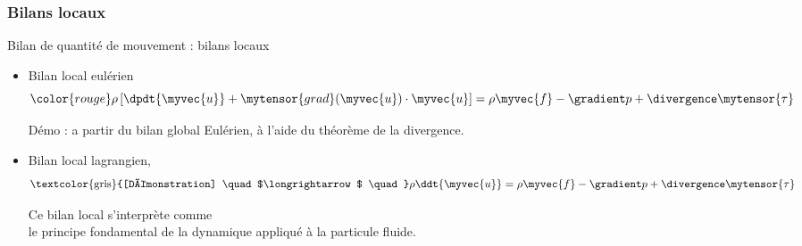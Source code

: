 \subsubsection{Bilans locaux}
\begin{frame}{Bilan de quantité de mouvement : bilans locaux}

\small


\medskip
\pause

\begin{itemize}
\item
  Bilan local eulérien 
	\begin{equation}
		\color{rouge}
		\rho \left [ \dpdt{\myvec{u}} +  \mytensor{grad}(\myvec{u}) \cdot \myvec{u} \right ]
		= \rho \myvec{f} - \gradient p + \divergence \mytensor{\tau}
		\label{eq:bilan_local_eulerien_qdm}
	\end{equation}


Démo : a partir du bilan global  Eulérien, à l'aide du théorème de la divergence.


\item
	Bilan local lagrangien, 
	\begin{equation}
		\mbox{\textcolor{gris}{[Démonstration] \quad $\longrightarrow$ \quad}}
		\rho \ddt{\myvec{u}} 
		= 
		\rho \myvec{f}  - \gradient p + \divergence \mytensor{\tau}
	\end{equation}
	
	\medskip
	Ce bilan local s'interprète comme
	\\ le \textcolor{vert}{principe fondamental de la dynamique} appliqué à la particule fluide.

	\pause

	
\bigskip
\pause

\end{itemize}


\vspace{15mm}

\end{frame}

